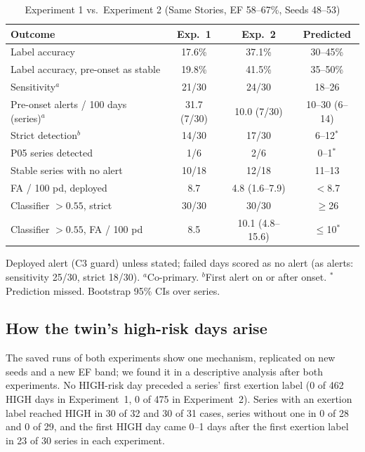 \documentclass[conference]{IEEEtran}
\begin{document}
\begin{table}[!t]
\centering
\caption{Experiment 1 vs.\ Experiment 2 (Same Stories, EF 58--67\%, Seeds 48--53)}
\label{tab:exp2}
\footnotesize
\begin{threeparttable}
\setlength{\tabcolsep}{3pt}
\begin{tabularx}{\columnwidth}{@{}Yccc@{}}
\toprule
\textbf{Outcome} & \textbf{Exp.\ 1} & \textbf{Exp.\ 2} & \textbf{Predicted} \\
\midrule
Label accuracy & 17.6\% & 37.1\% & 30--45\% \\
Label accuracy, pre-onset as stable & 19.8\% & 41.5\% & 35--50\% \\
Sensitivity$^{a}$ & 21/30 & 24/30 & 18--26 \\
Pre-onset alerts / 100 days (series)$^{a}$ & 31.7 (7/30) & 10.0 (7/30) & 10--30 (6--14) \\
Strict detection$^{b}$ & 14/30 & 17/30 & 6--12$^{*}$ \\
P05 series detected & 1/6 & 2/6 & 0--1$^{*}$ \\
Stable series with no alert & 10/18 & 12/18 & 11--13 \\
FA / 100 pd, deployed & 8.7 & 4.8 (1.6--7.9) & $<$8.7 \\
Classifier $>0.55$, strict & 30/30 & 30/30 & $\geq$26 \\
Classifier $>0.55$, FA / 100 pd & 8.5 & 10.1 (4.8--15.6) & $\leq$10$^{*}$ \\
\bottomrule
\end{tabularx}
\begin{tablenotes}\footnotesize
\item Deployed alert (C3 guard) unless stated; failed days scored as no alert (as alerts: sensitivity 25/30, strict 18/30). $^{a}$Co-primary. $^{b}$First alert on or after onset. $^{*}$Prediction missed. Bootstrap 95\% CIs over series.
\end{tablenotes}
\end{threeparttable}
\end{table}

\subsection{How the twin's high-risk days arise}\label{sec:mechanism}
The saved runs of both experiments show one mechanism, replicated on new seeds and a new EF band; we found it in a descriptive analysis after both experiments. No HIGH-risk day preceded a series' first exertion label (0 of 462 HIGH days in Experiment~1, 0 of 475 in Experiment~2). Series with an exertion label reached HIGH in 30 of 32 and 30 of 31 cases, series without one in 0 of 28 and 0 of 29, and the first HIGH day came 0--1 days after the first exertion label in 23 of 30 series in each experiment.
\end{document}
